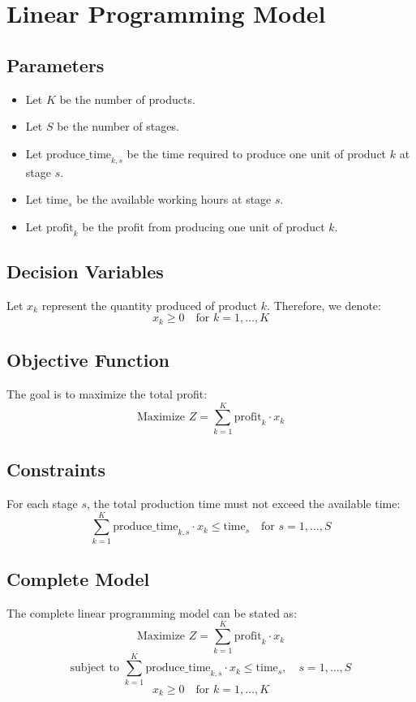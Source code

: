 \documentclass{article}
\begin{document}
\section*{Linear Programming Model}

\subsection*{Parameters}
\begin{itemize}
    \item Let \( K \) be the number of products.
    \item Let \( S \) be the number of stages.
    \item Let \( \text{produce\_time}_{k, s} \) be the time required to produce one unit of product \( k \) at stage \( s \).
    \item Let \( \text{time}_{s} \) be the available working hours at stage \( s \).
    \item Let \( \text{profit}_{k} \) be the profit from producing one unit of product \( k \).
\end{itemize}

\subsection*{Decision Variables}
Let \( x_k \) represent the quantity produced of product \( k \). Therefore, we denote:
\[
x_k \geq 0 \quad \text{for } k = 1, \ldots, K
\]

\subsection*{Objective Function}
The goal is to maximize the total profit:
\[
\text{Maximize } Z = \sum_{k=1}^{K} \text{profit}_{k} \cdot x_k
\]

\subsection*{Constraints}
For each stage \( s \), the total production time must not exceed the available time:
\[
\sum_{k=1}^{K} \text{produce\_time}_{k, s} \cdot x_k \leq \text{time}_{s} \quad \text{for } s = 1, \ldots, S
\]

\subsection*{Complete Model}
The complete linear programming model can be stated as:
\[
\text{Maximize } Z = \sum_{k=1}^{K} \text{profit}_{k} \cdot x_k
\]
\[
\text{subject to } \sum_{k=1}^{K} \text{produce\_time}_{k, s} \cdot x_k \leq \text{time}_{s}, \quad s = 1, \ldots, S
\]
\[
x_k \geq 0 \quad \text{for } k = 1, \ldots, K
\]
\end{document}
